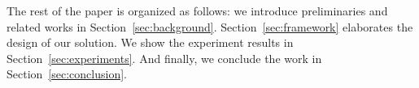 The rest of the paper is organized as follows: we introduce preliminaries and related works in Section~\ref{sec:background}.
Section~\ref{sec:framework} elaborates the design of our solution.
We show the experiment results in Section~\ref{sec:experiments}.
And finally, we conclude the work in Section~\ref{sec:conclusion}.
